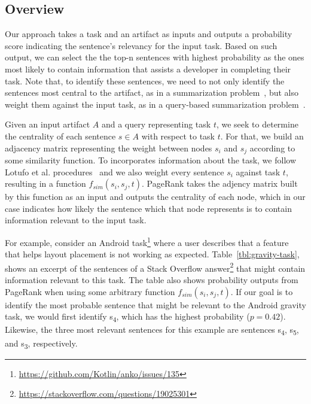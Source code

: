 \subsection{Overview}


Our approach takes a task and an artifact as inputs and outputs 
a probability score indicating the sentence's relevancy for the input task. 
Based on such output, we can select the the top-n sentences with highest probability as the ones most likely to contain information that assists a developer in completing their task. 
Note that, to identify these sentences, we need to not only identify the sentences most central to the artifact, as in a summarization problem~\cite{Rastkar2010,Lotufo2012},
but also weight them against the input task, as in a query-based summarization problem~\cite{Xu2017, Goldsteinet1999}.



Given an input artifact $A$ and a query representing task $t$, we seek to determine the centrality of each sentence $s \in A$ with respect to task $t$.
For that, we build an adjacency matrix representing the weight between nodes $s_i$ and $s_j$ according to some similarity function.
To incorporates information about the task,
we follow Lotufo et al. procedures~\cite{Lotufo2012} and we also weight every sentence $s_i$ against task $t$, resulting in a function  
$f_{sim}(s_i, s_j, t)$. 
PageRank takes the adjency matrix built by this function as an input and outputs the centrality of each node, which in our case indicates how likely the sentence which that node represents 
is to contain information relevant to the input task.



For example, consider an Android task\footnote{\url{https://github.com/Kotlin/anko/issues/135}} where a user describes that a feature that helps layout placement 
is not working as expected.
Table~\ref{tbl:gravity-task}, shows an excerpt of the sentences of a Stack Overflow answer\footnote{\url{https://stackoverflow.com/questions/19025301}}
that might contain information relevant to this task.
The table also shows probability outputs from PageRank when using some arbitrary function $f_{sim}(s_i, s_j, t)$.
If our goal is to identify the most probable sentence that might be relevant to the Android gravity task, 
we would first identify s\textsubscript{4}, which has the highest probability ($p=0.42$).
Likewise, the three most relevant sentences for this example are sentences s\textsubscript{4}, s\textsubscript{5}, and s\textsubscript{3}, respectively.


